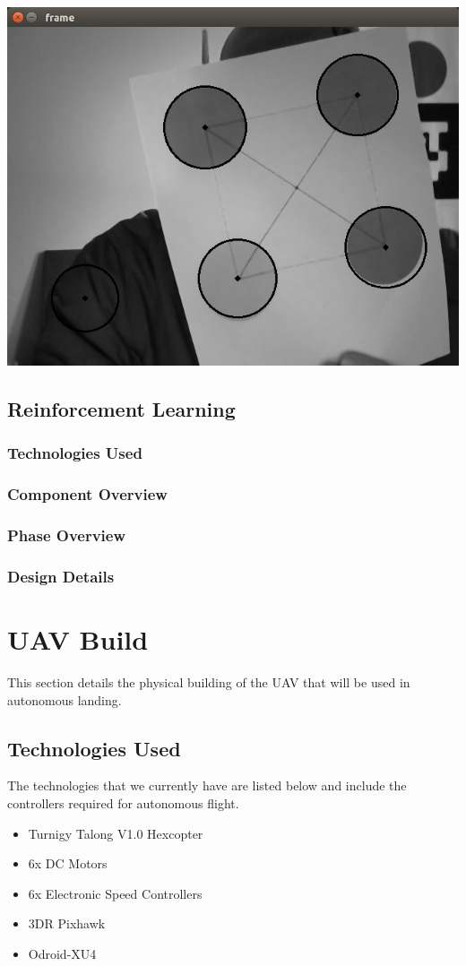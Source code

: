 \begin{center} \includegraphics[width=.5\textwidth]{circles.png} \end{center}

\subsection{Reinforcement Learning}
\subsubsection{Technologies  Used}
\subsubsection{Component  Overview}
\subsubsection{Phase Overview}
\subsubsection{Design Details}

\section{UAV Build}
This section details the physical building of the UAV that will be used in autonomous landing.
\subsection{Technologies  Used}
The technologies that we currently have are listed below and include the controllers required for autonomous flight.
\begin{itemize}
	\item Turnigy Talong V1.0 Hexcopter
	\item 6x DC Motors
	\item 6x Electronic Speed Controllers
	\item 3DR Pixhawk
	\item Odroid-XU4
\end{itemize}
